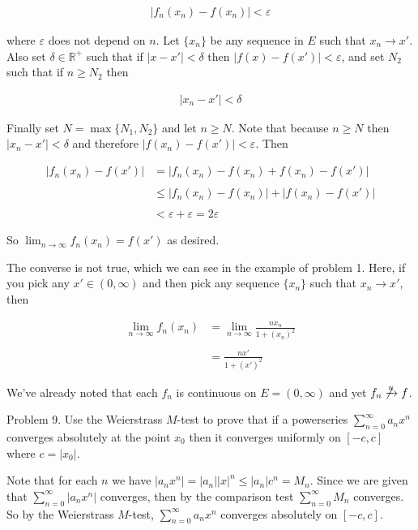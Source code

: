 \documentclass{article}
\begin{document}
  \begin{align*}
    |f_n(x_n)-f(x_n)|<\varepsilon
  \end{align*}
  
  where $\varepsilon$ does not depend on $n$.  Let $\{x_n\}$ be any sequence in $E$ such that $x_n\to x'$. Also set $\delta\in\mathbb R^+$ such that if $|x-x'|<\delta$ then $|f(x)-f(x')|<\varepsilon$, and set $N_2$ such that if $n\geq N_2$ then 

  \begin{align*}
    |x_n-x'|<\delta
  \end{align*}

  Finally set $N=\max\{N_1,N_2\}$ and let $n\geq N$.  Note that because $n\geq N$ then $|x_n-x'|<\delta$ and therefore $|f(x_n)-f(x')|<\varepsilon$.  Then 

  \begin{align*}
    |f_n(x_n)-f(x')| &= |f_n(x_n)-f(x_n)+f(x_n)-f(x')| \\\\
    &\le |f_n(x_n)-f(x_n)|+|f(x_n)-f(x')| \\\\
    &< \varepsilon+\varepsilon = 2\varepsilon
  \end{align*}

  So $\lim_{n\to \infty} f_n(x_n)=f(x')$ as desired.

  \vspace{1cm}

  The converse is not true, which we can see in the example of problem 1.  Here, if you pick any $x'\in (0,\infty)$ and then pick any sequence $\{x_n\}$ such that $x_n\to x'$, then 
  
  \begin{align*}
    \lim_{n\to \infty}f_n(x_n) &= \lim_{n\to \infty} \frac{nx_n}{1+(x_n)^2} \\\\
    &= \frac{nx'}{1+(x')^2}
  \end{align*}

  We've already noted that each $f_n$ is continuous on $E=(0,\infty)$ and yet $f_n\not\xrightarrow{u} f$.

  \pagebreak

  {\Large \color{Sepia} Problem 9. Use the Weierstrass $M$-test to prove that if a powerseries $\displaystyle \sum_{n=0}^\infty a_nx^n$ converges absolutely at the point $x_0$ then it converges uniformly on $[-c,c]$ where $c=|x_0|$.}

  \vspace{1cm}

  Note that for each $n$ we have $|a_n x^n|=|a_n||x|^n \leq |a_n|c^n = M_n$.  Since we are given that $\sum_{n=0}^\infty |a_nx^n|$ converges, then by the comparison test $\sum_{n=0}^\infty M_n$ converges.  So by the Weierstrass $M$-test, $\sum_{n=0}^\infty a_nx^n$ converges absolutely on $[-c,c]$.

  \pagebreak
\end{document}
